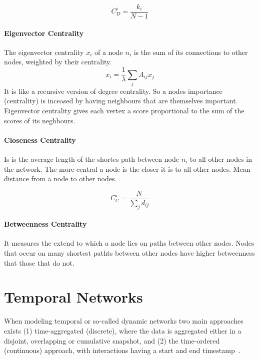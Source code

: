 $$C^i_D=\frac{k_i}{N-1}$$

\paragraph{Eigenvector Centrality}
The eigenvector centrality $x_i$ of a node $n_i$ is the sum of its connections to other nodes, weighted by their centrality.
$$x_i= \frac{1}{\lambda}\sum_{j}A_{ij}x_j$$
It is like a recursive version of degree centrality. So a nodes importance (centrality) is inceased by having neighbours that are themselves important. Eigenvector centrality gives each vertex a score proportional to the sum of the scores of its neghbours.~\cite{newman2010networks}

\paragraph{Closeness Centrality}
Is is the average length of the shortes path between node $n_i$ to all other nodes in the network. The more central a node is the closer it is to all other nodes. Mean distance from a node to other nodes.~\cite{newman2010networks}

$$C_C^i=\frac{N}{\sum_{j}d_{ij}}$$

\paragraph{Betweenness Centrality}
It measures the extend to which a node lies on paths between other nodes. Nodes that occur on many shortest pathts between other nodes have higher betweenness that those that do not.

\section{Temporal Networks}
When modeling temporal or so-called dynamic networks two main approaches exists (1) time-aggregated (discrete), where the data is aggregated either in a disjoint, overlapping or cumulative snapshot, and (2) the time-ordered (continuous) approach, with interactions having a start and end timestamp~\cite{moody2005dynamic, Pinter-Wollman2014, blonder2012temporal}.

